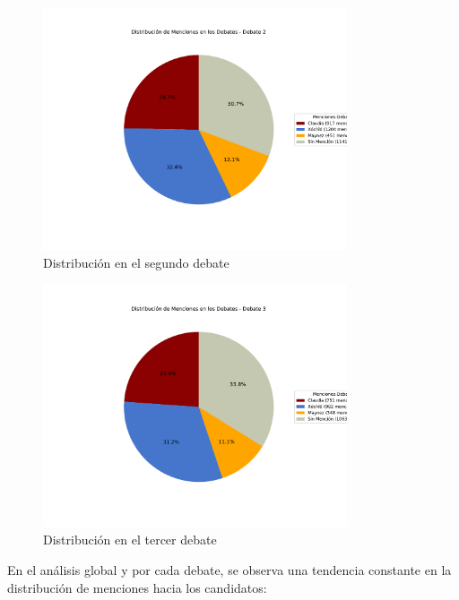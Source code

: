 \documentclass[10pt, a4paper]{article}
\begin{document}
	\begin{figure}[h!]
		\centering
		\includegraphics[width=0.8\textwidth]{grafica_debate2.pdf} %
		\vspace{-15mm}
		\caption{Distribución en el segundo debate}
		\label{fig:distrDebate2} %
	\end{figure}
	
	\begin{figure}[h!]
		\centering
		\includegraphics[width=0.8\textwidth]{grafica_debate3.pdf} %
		\vspace{-15mm}
		\caption{Distribución en el tercer debate}
		\label{fig:distrDebate3} %
	\end{figure}
	
	\newpage
	
	En el análisis global y por cada debate, se observa una tendencia constante en la distribución de menciones hacia los candidatos:
	
\end{document}
